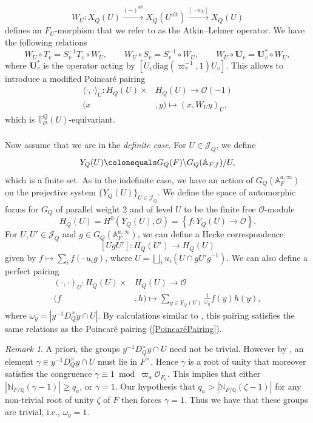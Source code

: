 \documentclass[a4paper, notitlepage, 10pt]{amsart}
\theoremstyle{plain} %
\theoremstyle{definition} %
\theoremstyle{remark} %
\newtheorem{remark}[theorem]{Remark}
\numberwithin{equation}{section}
\newcommand{\bbA}{\mathbb A}
\newcommand{\bbQ}{\mathbb Q}
\newcommand{\bbT}{\mathbb T}
\newcommand{\alt}{\operatorname{alt}}
\begin{document}
$$ W_U\colon  X_Q(U)\xrightarrow{(-)^{\alt}} X_Q(U^{\alt})\xrightarrow{[\ \cdot  w_U]} X_Q(U) $$
defines an $F_U$-morphism that we refer to as the Atkin--Lehner operator. We have the following relations
$$ W_U\circ T_v=S_v^{-1}T_v\circ W_U, \quad \quad W_U\circ S_v=S_v^{-1}\circ W_U, \quad \quad W_U\circ \mathbf{U}_v=\mathbf{U}_v^*\circ W_U, $$
where $\mathbf{U}_v^*$ is the operator acting by $[U_v\mathrm{diag}(\varpi_v^{-1},1)U_v]$.
This allows to introduce a modified Poincaré pairing 
\begin{align*}
    \langle\cdot,\cdot\rangle_U \colon H_Q(U)\times & H_Q(U)\longrightarrow \mathcal{O}(-1)
    \\(x&,y)\mapsto (x,W_Uy)_U,
\end{align*}
which is $\overline{\bbT}{}^Q_{\mathcal{O}}(U)$-equivariant. 
\subsubsection{}\label{Shimura set} Now assume that we are in the \emph{definite case}. For $U\in \mathcal{J}_Q$, we define 
$$ Y_Q(U)\colonequals G_{Q}(F)\backslash G_{Q}(\mathbb{A}_{F,f})/U, $$
which is a finite set. As in the indefinite case, we have an action of $G_Q(\mathbb{A}_{F}^{a,\infty})$ on the projective system $\{Y_Q(U)\}_{U\in \mathcal{J}_Q}$. We define the space of automorphic forms for $G_Q$ of parallel weight $2$ and of level $U$ to be the finite free $\mathcal{O}$-module
$$ H_Q(U)=H^0(Y_Q(U),\mathcal{O})=\left\{ f\colon Y_Q(U)\longrightarrow \mathcal{O}\right\}. $$
For $U,U'\in \mathcal{J}_Q$ and $g\in G_Q(\bbA^{a,\infty}_F)$, we can define a Hecke correspondence
$$ [UgU']\colon H_Q(U')\longrightarrow H_Q(U) $$
given by $f\mapsto \sum_i f(\cdot\ u_ig)$, where $U=\bigsqcup_i u_i (U\cap gU'g^{-1})$. We can also define a perfect pairing
\begin{equation}\label{pairingdefinite}
\begin{split}
        (\cdot,\cdot)_U \colon H_Q(U)\times &H_Q(U) \longrightarrow \mathcal{O}
    \\ (f&,h) \mapsto \sum_{y\in Y_Q(U)} \frac{1}{\omega_y} f(y)h(y),
\end{split}
\end{equation}
where $\omega_y= | y^{-1}D_Q^\times y \cap U|$. By calculations similar to \cite[Proposition 3]{Newton11}, this pairing satisfies the same relations as the Poincaré pairing (\ref{PoincaréPairing}). 

\begin{remark}\label{wy1}
    A priori, the groups $y^{-1}D_Q^\times y \cap U$ need not be trivial. However  by \cite[Lemma 4.2]{Tho16}, an element $\gamma \in y^{-1}D_Q^\times y \cap U$ must lie in $F^\times$. Hence $\gamma$ is a root of unity that moreover satisfies the congruence $\gamma\equiv 1 \bmod \varpi_a \mathcal{O}_{F_a}$. This implies that either $|\mathbb{N}_{F/\bbQ}(\gamma-1)|\ge q_a$, or $\gamma=1$.  Our hypothesis that $q_a> |\mathbb{N}_{F/\bbQ}(\zeta-1)|$ for any non-trivial root of unity $\zeta$ of $F$ then forces $\gamma=1$. Thus we have that these groups are trivial, i.e., $\omega_y=1$.
\end{remark}
\end{document}
